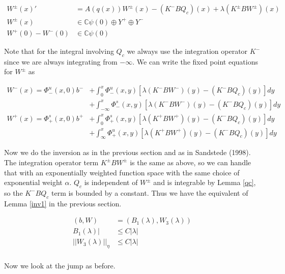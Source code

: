 \documentclass[12pt]{article}
\def\C{{\mathbb C}}
\begin{document}
\begin{align*}
W^\pm(x)' &= A(q(x)) W^\pm(x) - (K^- B Q_c)(x) + \lambda (K^\pm B W^\pm)(x) \\
W^\pm(x) &\in \C \psi(0) \oplus Y^+ \oplus Y^- \\
W^+(0) - W^-(0) &\in \C \psi(0) 
\end{align*}

Note that for the integral involving $Q_c$ we always use the integration operator $K^-$ since we are always integrating from $-\infty$. We can write the fixed point equations for $W^\pm$ as

\begin{align*}
W^-(x) = \Phi^u_-(x, 0)b^- &+ \int_0^x \Phi^u_-(x, y)[\lambda (K^- B W^-)(y) - (K^- B Q_c)(y) ] dy \\
&+ \int_{-\infty}^x \Phi^s_-(x, y)[\lambda (K^- B W^-)(y) - (K^- B Q_c)(y) ] dy \\
W^+(x) = \Phi^s_+(x, 0)b^+ &+ \int_0^x \Phi^s_+(x, y)[\lambda (K^+ B W^+)(y) - (K^- B Q_c)(y) ] dy \\
&+ \int_{\infty}^x \Phi^u_+(x, y)[\lambda (K^+ B W^+)(y) - (K^- B Q_c)(y) ] dy
\end{align*}

Now we do the inversion as in the previous section and as in Sandstede (1998). The integration operator term $K^\pm B W^\pm$ is the same as above, so we can handle that with an exponentially weighted function space with the same choice of exponential weight $\alpha$. $Q_c$ is independent of $W^\pm$ and is integrable by Lemma \ref{qc}, so the $K^- B Q_c$ term is bounded by a constant. Thus we have the equivalent of Lemma \ref{inv1} in the previous section.

\begin{align*}
(b, W) &= (B_1(\lambda), W_3(\lambda))\\
B_1(\lambda)| &\leq C|\lambda|\\
||W_3(\lambda)||_\eta &\leq C|\lambda|\\
\end{align*}

Now we look at the jump as before. 
\end{document}
